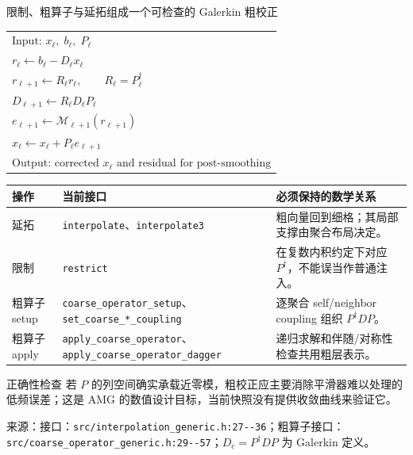\documentclass[UTF8,aspectratio=169,11pt]{ctexbeamer}
\newcommand{\source}[1]{%
  \vspace{0.06em}\par{\raggedright\scriptsize\color{muted}来源：#1\par}}
\newcommand{\code}[1]{\nolinkurl{#1}}
\newcommand{\denseframe}{%
  \footnotesize
  \setlength{\tabcolsep}{2.5pt}%
  \renewcommand{\arraystretch}{0.76}%
}
\begin{document}
\begin{frame}[t]{限制、粗算子与延拓组成一个可检查的 Galerkin 粗校正}
  \denseframe
  \scriptsize
  \begin{tabular}{@{}l@{}}
    $\text{Input: }x_\ell,\;b_\ell,\;P_\ell$ \\
    $r_\ell\gets b_\ell-D_\ell x_\ell$ \\
    $r_{\ell+1}\gets R_\ell r_\ell,\qquad R_\ell=P_\ell^\dagger$ \\
    $D_{\ell+1}\gets R_\ell D_\ell P_\ell$ \\
    $e_{\ell+1}\gets\mathcal{M}_{\ell+1}(r_{\ell+1})$ \\
    $x_\ell\gets x_\ell+P_\ell e_{\ell+1}$ \\
    $\text{Output: corrected }x_\ell\text{ and residual for post-smoothing}$
  \end{tabular}
  \vspace{0cm}
  \begin{tabularx}{0.96\textwidth}{@{}p{}p{}Y@{}}
    \toprule
    操作 & 当前接口 & 必须保持的数学关系 \\
    \midrule
    延拓 & \code{interpolate}、\code{interpolate3} & 粗向量回到细格；其局部支撑由聚合布局决定。 \\
    限制 & \code{restrict} & 在复数内积约定下对应 $P^\dagger$，不能误当作普通注入。 \\
    粗算子 setup & \code{coarse_operator_setup}、\code{set_coarse_*_coupling} & 逐聚合 self/neighbor coupling 组织 $P^\dagger D P$。 \\
    粗算子 apply & \code{apply_coarse_operator}、\code{apply_coarse_operator_dagger} & 递归求解和伴随/对称性检查共用粗层表示。 \\
    \bottomrule
  \end{tabularx}
  \begin{block}{正确性检查}
    若 $P$ 的列空间确实承载近零模，粗校正应主要消除平滑器难以处理的低频误差；这是 AMG 的数值设计目标，当前快照没有提供收敛曲线来验证它。
  \end{block}
  \source{接口：\code{src/interpolation_generic.h:27--36}；粗算子接口：\code{src/coarse_operator_generic.h:29--57}；$D_c=P^\dagger D P$ 为 Galerkin 定义。}
\end{frame}
\end{document}
